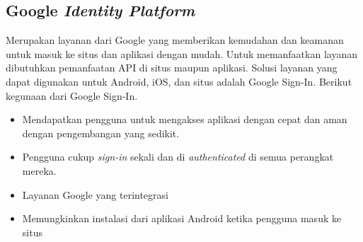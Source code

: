 \subsection{Google \textit{Identity Platform}}
\label{subsec:googleidentityplatform}
\hspace{0,5cm} Merupakan layanan dari Google yang memberikan kemudahan dan keamanan  untuk masuk ke situs dan aplikasi dengan mudah. Untuk memanfaatkan layanan dibutuhkan pemanfaatan API di situs maupun aplikasi. Solusi layanan yang dapat digunakan untuk Android, iOS, dan situs adalah Google Sign-In\cite{android}. Berikut kegunaan dari Google Sign-In.
\begin{itemize}
	\item Mendapatkan pengguna untuk mengakses aplikasi dengan cepat dan aman dengan pengembangan yang sedikit. 
	\item Pengguna cukup \textit{sign-in} sekali dan di \textit{authenticated} di semua perangkat mereka.
	\item Layanan Google yang terintegrasi
	\item Memungkinkan instalasi dari aplikasi Android ketika pengguna masuk ke situs
\end{itemize}
   
